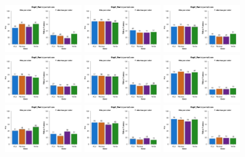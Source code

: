 \documentclass[a4paper ]{article}
\begin{document}
\begin{figure}[th]
\centering
\includegraphics[width=0.3\textwidth]{Figures/Color_Exp2_P1} \includegraphics[width=0.3\textwidth]{Figures/Color_Exp2_P2} \includegraphics[width=0.3\textwidth]{Figures/Color_Exp2_P3}
\includegraphics[width=0.3\textwidth]{Figures/Color_Exp2_P4} \includegraphics[width=0.3\textwidth]{Figures/Color_Exp2_P5} \includegraphics[width=0.3\textwidth]{Figures/Color_Exp2_P6}
\includegraphics[width=0.3\textwidth]{Figures/Color_Exp2_P7} \includegraphics[width=0.3\textwidth]{Figures/Color_Exp2_P8} \includegraphics[width=0.3\textwidth]{Figures/Color_Exp2_P9}

\end{figure}
\end{document}
